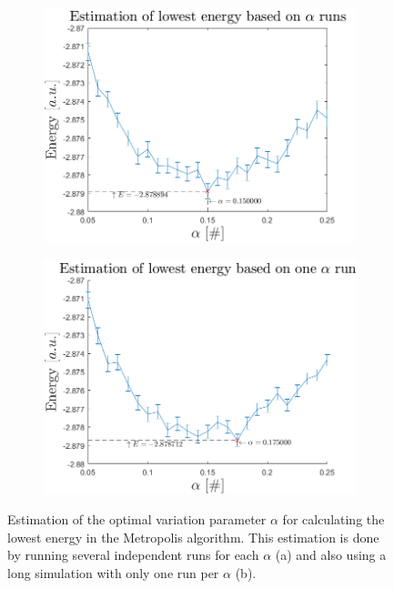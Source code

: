 \begin{figure}[H]
	\centering
	\captionsetup[subfigure]{justification=centering}
	\begin{subfigure}[b]{0.7\textwidth}
		\centering
		\includegraphics[width=\textwidth]{graphics/task3/lowest_energy_indep_alpha.png}
		\caption{}
		\label{fig:optimize_alpha_a}
	\end{subfigure}
	\begin{subfigure}[b]{0.7\textwidth}
		\centering
		\includegraphics[width=\textwidth]{graphics/task3/lowest_energy_one_alpha_run.png}
		\caption{}
		\label{fig:optimize_alpha_b}
	\end{subfigure}
	\caption{Estimation of the optimal variation parameter $\alpha$ for calculating the lowest energy in the Metropolis algorithm. This estimation is done by running several independent runs for each $\alpha$ (a) and also using a long simulation with only one run per $\alpha$ (b).}
	\label{fig:optimize_alpha}
\end{figure}

